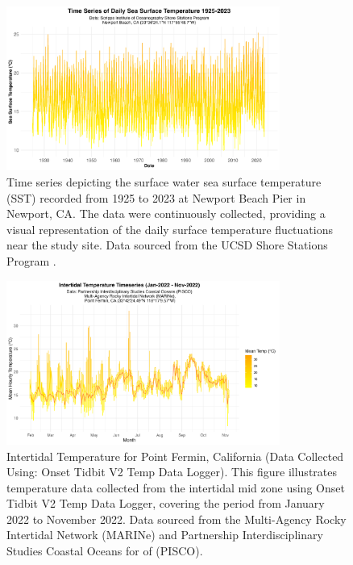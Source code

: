 \documentclass[
]{article}
\begin{document}
\begin{figure}[htbp]
  \centering
  \includegraphics[width=0.8\textwidth]{Images/SST_timeseries_plot.png}
  \caption{Time series depicting the surface water sea surface temperature (SST) recorded from 1925 to 2023 at Newport Beach Pier in Newport, CA. The data were continuously collected, providing a visual representation of the daily surface temperature fluctuations near the study site. Data sourced from the UCSD Shore Stations Program \citep{carter2022shore}.}
  \label{fig:sst-timeseries}
\end{figure}

\begin{figure}[htbp]
  \centering
  \includegraphics[width=0.8\textwidth]{Images/intertidal_timeseries_plot.png}
  \caption{Intertidal Temperature for Point Fermin, California (Data Collected Using: Onset Tidbit V2 Temp Data Logger). This figure illustrates temperature data collected from the intertidal mid zone using Onset Tidbit V2 Temp Data Logger, covering the period from January 2022 to November 2022. Data sourced from the Multi-Agency Rocky Intertidal Network (MARINe) and Partnership Interdisciplinary Studies Coastal Oceans for of (PISCO). \citep{marine_pisco_burnaford_2023}}
  \label{fig:intertidal-timeseries}
\end{figure}
\end{document}
